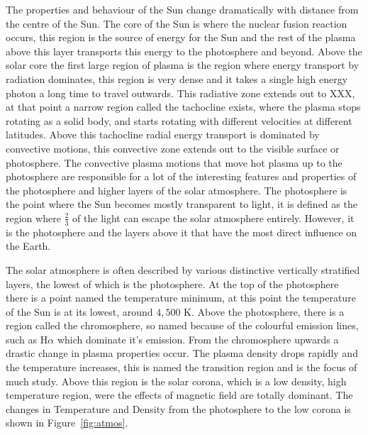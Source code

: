 The properties and behaviour of the Sun change dramatically with distance from the centre of the Sun.
The core of the Sun is where the nuclear fusion reaction occurs, this region is the source of energy for the Sun and the rest of the plasma above this layer transports this energy to the photosphere and beyond.
Above the solar core the first large region of plasma is the region where energy transport by radiation dominates, this region is very dense and it takes a single high energy photon a long time to travel outwards.
This radiative zone extends out to XXX, at that point a narrow region called the tachocline exists, where the plasma stops rotating as a solid body, and starts rotating with different velocities at different latitudes.
Above this tachocline radial energy transport is dominated by convective motions, this convective zone extends out to the visible surface or photosphere.
The convective plasma motions that move hot plasma up to the photosphere are responsible for a lot of the interesting features and properties of the photosphere and higher layers of the solar atmosphere.
The photosphere is the point where the Sun becomes mostly transparent to light, it is defined as the region where $\frac{2}{3}$ of the light can escape the solar atmosphere entirely.
However, it is the photosphere and the layers above it that have the most direct influence on the Earth.

The solar atmosphere is often described by various distinctive vertically stratified layers, the lowest of which is the photosphere.
At the top of the photosphere there is a point named the temperature minimum, at this point the temperature of the Sun is at its lowest, around $4,500$ K.
Above the photosphere, there is a region called the chromosphere, so named because of the colourful emission lines, such as H$\alpha$ which dominate it's emission.
From the chromosphere upwards a drastic change in plasma properties occur.
The plasma density drops rapidly and the temperature increases, this is named the transition region and is the focus of much study.
Above this region is the solar corona, which is a low density, high temperature region, were the effects of magnetic field are totally dominant.
The changes in Temperature and Density from the photosphere to the low corona is shown in Figure~\ref{fig:atmos}.

